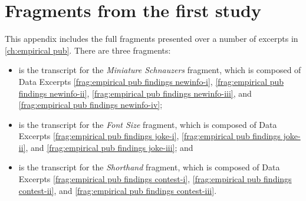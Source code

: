 


\chapter{Fragments from the first study}\label{app:fragments-pub}



This appendix includes the full fragments presented over a number of excerpts in \autoref{ch:empirical pub}. There are three fragments:

\begin{itemize}
    \item {} is the transcript for the \textit{Miniature Schnauzers} fragment, which is composed of Data Excerpts \ref{frag:empirical pub findings newinfo-i}, \ref{frag:empirical pub findings newinfo-ii}, \ref{frag:empirical pub findings newinfo-iii}, and \ref{frag:empirical pub findings newinfo-iv};
    \item {} is the transcript for the \textit{Font Size} fragment, which is composed of Data Excerpts \ref{frag:empirical pub findings joke-i}, \ref{frag:empirical pub findings joke-ii}, and \ref{frag:empirical pub findings joke-iii}; and
    \item {} is the transcript for the \textit{Shorthand} fragment, which is composed of Data Excerpts \ref{frag:empirical pub findings contest-i}, \ref{frag:empirical pub findings contest-ii}, and \ref{frag:empirical pub findings contest-iii}.
\end{itemize}


